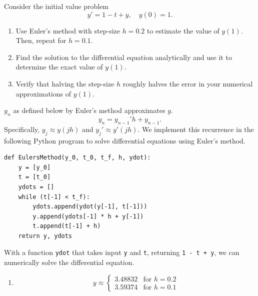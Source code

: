 \documentclass[12 pt, letterpaper]{hmcpset}
\begin{document}
\begin{problem}[1:]
	Consider the initial value problem
	\[
		y' = 1 - t + y, \quad y(0) = 1.
	\]
	\begin{enumerate}
		\item Use Euler's method with step-size $h = 0.2$ to estimate the value of $y(1)$. Then, repeat for $h = 0.1$.
		\item Find the solution to the differential equation analytically and use it to determine the exact value of $y(1)$.
		\item Verify that halving the step-size $h$ roughly halves the error in your numerical approximations of $y(1)$.
	\end{enumerate}
\end{problem}

\begin{solution}
	$y_{n}$ as defined below by Euler's method approximates $y$.
	\[
		y_{n} = y_{n - 1}' h + y_{n - 1}.
	\]
	Specifically, $y_{j} \approx y(jh)$ and $y_{j}' \approx y'(jh)$. We implement this recurrence in the following Python program to solve differential equations using Euler's method.
\begin{verbatim}
def EulersMethod(y_0, t_0, t_f, h, ydot):
    y = [y_0]
    t = [t_0]
    ydots = []
    while (t[-1] < t_f):
        ydots.append(ydot(y[-1], t[-1]))
        y.append(ydots[-1] * h + y[-1])
        t.append(t[-1] + h)
    return y, ydots	
\end{verbatim}
	With a function \texttt{ydot} that takes input \texttt{y} and \texttt{t}, returning \texttt{1 - t + y}, we can numerically solve the differential equation.

	\begin{enumerate}
		\item
			\[
				\boxed{
					y \approx \begin{cases}
					3.48832 & \text{for } h = 0.2 \\
					3.59374 & \text{for } h = 0.1
				\end{cases}
			}
			\]


\end{enumerate}
\end{solution}
\end{document}
